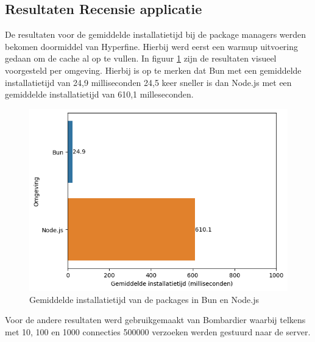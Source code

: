 \subsection{Resultaten Recensie applicatie}
De resultaten voor de gemiddelde installatietijd bij de package managers werden bekomen doormiddel van Hyperfine.
Hierbij werd eerst een warmup uitvoering gedaan om de cache al op te vullen.
In figuur \ref{fig:installatietijdapp} zijn de resultaten visueel voorgesteld per omgeving.
Hierbij is op te merken dat Bun met een gemiddelde installatietijd van 24,9 milliseconden 24,5 keer sneller 
is dan Node.js met een gemiddelde installatietijd van 610,1 milleseconden.
\begin{figure}[H]
  \centering
  \includegraphics{graphics/install.png}
  \caption{\label{fig:installatietijdapp}Gemiddelde installatietijd van de packages in Bun en Node.js}
\end{figure}

Voor de andere resultaten werd gebruikgemaakt van Bombardier waarbij telkens met 10, 100 en 1000 connecties 
500000 verzoeken werden gestuurd naar de server.

